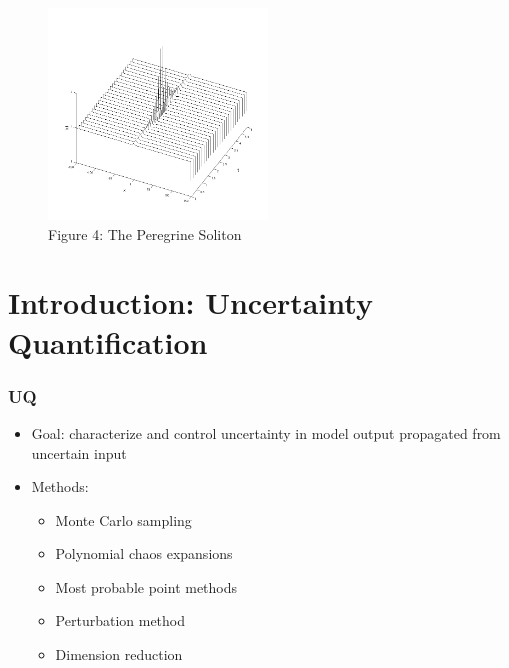\documentclass{beamer}
\def\b{\begin}
\def\e{\end}
\theoremstyle{plain}
\theoremstyle{definition}
\begin{document}
\frame
{
\frametitle{}

\begin{figure}
\begin{center}
\includegraphics[width=220px]{peregrine_4096pts_256plotted_0eps.png}\\
Figure 4: The Peregrine Soliton
\end{center}
\end{figure}


}

\section{Introduction: Uncertainty Quantification}

\frame
{
\frametitle{UQ}
\b{itemize}
\item Goal: characterize and control uncertainty in model output propagated from uncertain input\\[25pt]

\pause
\item Methods:
\b{itemize}
\item Monte Carlo sampling\\[5pt]
\item Polynomial chaos expansions\\[5pt]
\item Most probable point methods\\[5pt]
\item Perturbation method\\[5pt]
\item Dimension reduction
 
\e{itemize}
\e{itemize}
}
\end{document}
